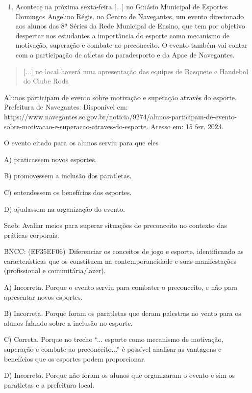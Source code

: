 \begin{enumerate}
\def\labelenumi{\arabic{enumi}.}
\item
  Acontece na próxima sexta-feira {[}...{]} no Ginásio Municipal de
  Esportes Domingos Angelino Régis, no Centro de Navegantes, um evento
  direcionado aos alunos das 8ª Séries da Rede Municipal de Ensino, que
  tem por objetivo despertar nos estudantes a importância do esporte
  como mecanismo de motivação, superação e combate ao preconceito. O
  evento também vai contar com a participação de atletas do paradesporto
  e da Apae de Navegantes.
\end{enumerate}

\begin{quote}
{[}...{]} no local haverá uma apresentação das equipes de Basquete e
Handebol do Clube Roda
\end{quote}

Alunos participam de evento sobre motivação e superação através do
esporte. Prefeitura de Navegantes. Disponível em:
https://www.navegantes.sc.gov.br/noticia/9274/alunos-participam-de-evento-sobre-motivacao-e-superacao-atraves-do-esporte.
Acesso em: 15 fev. 2023.

O evento citado para os alunos serviu para que eles

A) praticassem novos esportes.

B) promovessem a inclusão dos paratletas.

C) entendessem os benefícios dos esportes.

D) ajudassem na organização do evento.

Saeb: Avaliar meios para superar situações de preconceito no contexto
das práticas corporais.

BNCC: (EF35EF06)~Diferenciar os conceitos de jogo e esporte,
identificando as características que os constituem na contemporaneidade
e suas manifestações (profissional e comunitária/lazer).

A) Incorreta. Porque o evento serviu para combater o preconceito, e não
para apresentar novos esportes.

B) Incorreta. Porque foram os paratletas que deram palestras no vento
para os alunos falando sobre a inclusão no esporte.

C) Correta. Porque no trecho ``... esporte como mecanismo de motivação,
superação e combate ao preconceito...'' é possível analisar as vantagens
e benefícios que os esportes podem proporcionar.

D) Incorreta. Porque não foram os alunos que organizaram o evento e sim
os paratletas e a prefeitura local.

